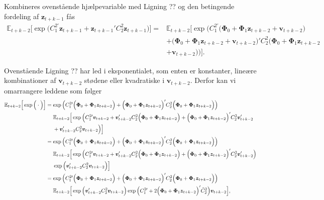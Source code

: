 \documentclass[
  a4paper,
  oneside]{memoir}
\begin{document}
Kombineres ovenstående hjælpevariable med Ligning ?? og den betingende fordeling af \(\bm{z}_{t+k-1}\) fås
\begin{align*}
\mathbb{E}_{t+k-2}\Big[ \exp\Big( C_1^{2\prime} \bm{z}_{t+k-1} + \bm{z}_{t+k-1}' C_2^2 \bm{z}_{t+k-1} \Big) ] = &\mathbb{E}_{t+k-2}[ \exp \Big( C_1^{2\prime} \Big(\bm{\Phi}_0+\bm{\Phi}_1\bm{z}_{t+k-2} + \bm{v}_{t+k-2} \Big)\\
                                                                                                  &+ \Big(\bm{\Phi}_0+\bm{\Phi}_1\bm{z}_{t+k-2} + \bm{v}_{t+k-2}\Big)' C_2^2 \Big(\bm{\Phi}_0+\bm{\Phi}_1\bm{z}_{t+k-2}\\
                                                                                                  &+ \bm{v}_{t+k-2}\Big) \Big) \Big].
\end{align*}

Ovenstående Ligning ?? har led i eksponentialet, som enten er konstanter, lineære kombinationer af \(\bm{v}_{t+k-2}\) stødene eller kvadratiske i \(\bm{v}_{t+k-2}\). Derfor kan vi omarrangere leddene som følger
\begin{align*}
\mathbb{E}_{t+k-2}\Big[\exp\Big(\cdot\Big)\Big] &= \exp\Big( C_1^{2\prime} \Big(\bm{\Phi}_0+\bm{\Phi}_1\bm{z}_{t+k-2} \Big) + \Big(\bm{\Phi}_0+\bm{\Phi}_1\bm{z}_{t+k-2} \Big)' C_2^2 \Big(\bm{\Phi}_0+\bm{\Phi}_1\bm{z}_{t+k-2} \Big)\Big)\\
                                &\,\,\quad \mathbb{E}_{t+k-2}\Big[\exp\Big( C_1^{2\prime} \bm{v}_{t+k-2}+ \bm{v}_{t+k-2}' C_2^2 \Big(\bm{\Phi}_0+\bm{\Phi}_1\bm{z}_{t+k-2} \Big) + \Big(\bm{\Phi}_0+\bm{\Phi}_1\bm{z}_{t+k-2} \Big)' C_2^{2} \bm{v}_{t+k-2}'\\
                                &\,\,\quad+ \bm{v}_{t+k-2}' C_2^2 \bm{v}_{t+k-2} \Big)\Big]\\
                                &= \exp\Big( C_1^{2\prime} \Big(\bm{\Phi}_0+\bm{\Phi}_1\bm{z}_{t+k-2} \Big) + \Big(\bm{\Phi}_0+\bm{\Phi}_1\bm{z}_{t+k-2} \Big)' C_2^2 \Big(\bm{\Phi}_0+\bm{\Phi}_1\bm{z}_{t+k-2} \Big)\Big)\\
                                &\,\,\quad \mathbb{E}_{t+k-2}\Big[\exp\Big( C_1^{2\prime} \bm{v}_{t+k-2}+ \bm{v}_{t+k-2}' C_2^2 \Big(\bm{\Phi}_0+\bm{\Phi}_1\bm{z}_{t+k-2} \Big) + \Big(\bm{\Phi}_0+\bm{\Phi}_1\bm{z}_{t+k-2} \Big)' C_2^{2} \bm{v}_{t+k-2}'\Big)\\
                                &\,\,\quad\exp\Big(\bm{v}_{t+k-2}' C_2^2 \bm{v}_{t+k-2} \Big)\Big]\\
                                &=\exp\Big( C_1^{2\prime} \Big(\bm{\Phi}_0+\bm{\Phi}_1\bm{z}_{t+k-2} \Big) + \Big(\bm{\Phi}_0+\bm{\Phi}_1\bm{z}_{t+k-2} \Big)' C_2^2 \Big(\bm{\Phi}_0+\bm{\Phi}_1\bm{z}_{t+k-2} \Big)\Big)\\
                                &\,\,\quad \mathbb{E}_{t+k-2}\Big[ \exp\Big(\bm{v}_{t+k-2}' C_2^2 \bm{v}_{t+k-2} \Big) \exp\Big( C_1^{2\prime} + 2\Big(\bm{\Phi}_0+\bm{\Phi}_1\bm{z}_{t+k-2}\Big)' \Tilde{C}_2^{2} \Big)   \bm{v}_{t+k-2}\Big],
\end{align*}
\end{document}
